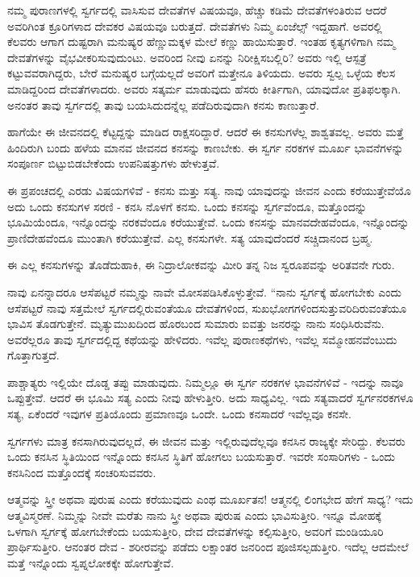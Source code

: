 ನಮ್ಮ ಪುರಾಣಗಳಲ್ಲಿ ಸ್ವರ್ಗದಲ್ಲಿ ವಾಸಿಸುವ ದೇವತೆಗಳ ವಿಷಯವೂ, ಹೆಚ್ಚು ಕಡಿಮೆ ದೇವತೆಗಳಂತಿರುವ ಆದರೆ ಅವರಿಗಿಂತ ಕ್ರೂರಿಗಳಾದ ದೇವಕರ ವಿಷಯವೂ ಬರುತ್ತದೆ. ದೇವತೆಗಳು ನಿಮ್ಮ ಏಂಜೆಲ್ಸ್  ಇದ್ದಹಾಗೆ. ಅವರಲ್ಲಿ ಕೆಲವರು ಆಗಾಗ ದುಷ್ಟರಾಗಿ ಮನುಷ್ಯರ ಹೆಣ್ಣುಮಕ್ಕಳ ಮೇಲೆ ಕಣ್ಣು ಹಾಯಿಸುತ್ತಾರೆ. ಇಂತಹ ಕೃತ್ಯಗಳಿಗಾಗಿ ನಮ್ಮ ದೇವತೆಗಳನ್ನು ವೈಭವೀಕರಿಸುವುದುಂಟು. ಅವರಿಂದ ನೀವು ಏನನ್ನು ನಿರೀಕ್ಷಿಸಬಲ್ಲಿರಿ? ಅವರು ಇಲ್ಲಿ ಆಸ್ಪತ್ರೆ ಕಟ್ಟುವವರಾಗಿದ್ದರು, ಬೇರೆ ಮನುಷ್ಯರ ಬಗ್ಗೆಯಲ್ಲದೆ ಅವರಿಗೆ ಮತ್ತೇನೂ ತಿಳಿಯದು. ಅವರು ಸ್ವಲ್ಪ ಒಳ್ಳೆಯ ಕೆಲಸ ಮಾಡಿದ್ದರಿಂದ ದೇವತೆಗಳಾದರು. ಅವರು ಸತ್ಕರ್ಮ ಮಾಡುವುದು ಹೆಸರು ಕೀರ್ತಿಗಾಗಿ, ಯಾವುದೋ ಪ್ರತಿಫಲಕ್ಕಾಗಿ. ಅನಂತರ ತಾವು ಸ್ವರ್ಗದಲ್ಲಿ ತಾವು ಬಯಸಿದುದನ್ನೆಲ್ಲ ಪಡೆದಿರುವುದಾಗಿ ಕನಸು ಕಾಣುತ್ತಾರೆ.

ಹಾಗೆಯೇ ಈ ಜೀವನದಲ್ಲಿ ಕೆಟ್ಟದ್ದನ್ನು ಮಾಡಿದ ರಾಕ್ಷಸರಿದ್ದಾರೆ. ಆದರೆ ಈ ಕನಸುಗಳೆಲ್ಲ ಶಾಶ್ವತವಲ್ಲ. ಅವರು ಮತ್ತೆ ಹಿಂದಿರುಗಿ ಬಂದು ಹಳೆಯ ಮಾನವ ಜೀವನದ ಕನಸನ್ನು ಕಾಣಬೇಕು. ಈ ಸ್ವರ್ಗ ನರಕಗಳ ಮೂರ್ಖ ಭಾವನೆಗಳನ್ನು ಸಂಪೂರ್ಣ ಬಿಟ್ಟುಬಿಡಬೇಕೆಂದು ಉಪನಿಷತ್ತುಗಳು ಹೇಳುತ್ತವೆ.

ಈ ಪ್ರಪಂಚದಲ್ಲಿ ಎರಡು ವಿಷಯಗಳಿವೆ - ಕನಸು ಮತ್ತು ಸತ್ಯ. ನಾವು ಯಾವುದನ್ನು ಜೀವನ ಎಂದು ಕರೆಯುತ್ತೇವೆಯೊ ಅದು ಒಂದು ಕನಸುಗಳ ಸರಣಿ - ಕನಸಿ ನೊಳಗೆ ಕನಸು. ಒಂದು ಕನಸನ್ನು ಸ್ವರ್ಗವೆಂದೂ, ಮತ್ತೊಂದನ್ನು ಭೂಮಿಯೆಂದೂ, ಇನ್ನೊಂದನ್ನು ನರಕವೆಂದೂ ಕರೆಯುತ್ತೇವೆ. ಒಂದು ಕನಸನ್ನು ಮಾನವದೇಹವೆಂದೂ, ಇನ್ನೊಂದನ್ನು ಪ್ರಾಣಿದೇಹವೆಂದೂ ಮುಂತಾಗಿ ಕರೆಯುತ್ತೇವೆ. ಎಲ್ಲ ಕನಸುಗಳೇ. ಸತ್ಯ ಯಾವುದೆಂದರೆ ಸಚ್ಚಿದಾನಂದ ಬ್ರಹ್ಮ.

ಈ ಎಲ್ಲ ಕನಸುಗಳನ್ನು ತೊಡೆದುಹಾಕಿ, ಈ ನಿದ್ರಾಲೋಕವನ್ನು ಮೀರಿ ತನ್ನ ನಿಜ ಸ್ವರೂಪವನ್ನು ಅರಿತವನೇ ಗುರು.

ನಾವು ಏನನ್ನಾದರೂ ಆಸೆಪಟ್ಟರೆ ನಮ್ಮನ್ನು ನಾವೇ ಮೋಸಪಡಿಸಿಕೊಳ್ಳುತ್ತೇವೆ. “ನಾನು ಸ್ವರ್ಗಕ್ಕೆ ಹೋಗಬೇಕು ಎಂದು ಆಸೆಪಟ್ಟರೆ ನಾವು ಸತ್ತಮೇಲೆ ಸ್ವರ್ಗದಲ್ಲಿರುವಂತೆಯೂ ದೇವತೆಗಳಿಂದ, ಸುಖಭೋಗಗಳಿಂದಸುತ್ತುವರಿದಿರುವಂತೆಯೂ ಭಾವಿಸ ತೊಡಗುತ್ತೇನೆ. ಮೃತ್ಯುಮುಖದಿಂದ ಹೊರಬಂದ ಸುಮಾರು ಐವತ್ತು ಜನರನ್ನು ನಾನು ಸಂಧಿಸಿರುವೆನು. ಅವರೆಲ್ಲರೂ ತಾವು ಸ್ವರ್ಗದಲ್ಲಿದ್ದ ಕಥೆಯನ್ನು ಹೇಳಿದರು. ಇವೆಲ್ಲ ಪುರಾಣಕಥೆಗಳು, ಇವೆಲ್ಲ ಸಮ್ಮೋಹನವೆಂಬುದು ಗೊತ್ತಾಗುತ್ತದೆ.

ಪಾಶ್ಚಾತ್ಯರು ಇಲ್ಲಿಯೇ ದೊಡ್ಡ ತಪ್ಪು ಮಾಡುವುದು. ನಿಮ್ಮಲ್ಲೂ ಈ ಸ್ವರ್ಗ ನರಕಗಳ ಭಾವನೆಗಳಿವೆ - ಇದನ್ನು ನಾವೂ ಒಪ್ಪುತ್ತೇವೆ. ಆದರೆ ಈ ಭೂಮಿ ಸತ್ಯ ಎಂದು ನೀವು ಹೇಳುತ್ತೀರಿ. ಅದು ಸಾಧ್ಯವಿಲ್ಲ. ಇದು ಸತ್ಯವಾದರೆ ಸ್ವರ್ಗನರಕಗಳೂ ಸತ್ಯ, ಏಕೆಂದರೆ ಇವುಗಳ ಪ್ರತಿಯೊಂದು ಪ್ರಮಾಣವೂ ಒಂದೇ. ಒಂದು ಕನಸಾದರೆ ಇವೆಲ್ಲವೂ ಕನಸೇ.

ಸ್ವರ್ಗಗಳು ಮಾತ್ರ ಕನಸಾಗಿರುವುದಲ್ಲದೆ, ಈ ಜೀವನ ಮತ್ತು ಇಲ್ಲಿರುವುದೆಲ್ಲವೂ ಕನಸಿನ ರಾಜ್ಯಕ್ಕೇ ಸೇರಿದ್ದು. ಕೆಲವರು ಒಂದು ಕನಸಿನ ಸ್ಥಿತಿಯಿಂದ ಇನ್ನೊಂದು ಕನಸಿನ ಸ್ಥಿತಿಗೆ ಹೋಗಲು ಬಯಸುತ್ತಾರೆ. ಇವರೇ ಸಂಸಾರಿಗಳು - ಒಂದು ಕನಸಿನಿಂದ ಮತ್ತೊಂದಕ್ಕೆ ಸಂಚರಿಸುವವರು.

ಆತ್ಮವನ್ನು ಸ್ತ್ರೀ ಅಥವಾ ಪುರುಷ ಎಂದು ಕರೆಯುವುದು ಎಂಥ ಮೂರ್ಖತನ! ಆತ್ಮನಲ್ಲಿ ಲಿಂಗಭೇದ ಹೇಗೆ ಸಾಧ್ಯ? ಇದು ಆತ್ಮವಿಸ್ಮರಣೆ. ನಿಮ್ಮನ್ನು ನೀವೇ ಮರೆತು ನಾನು ಸ್ತ್ರೀ ಅಥವಾ ಪುರುಷ ಎಂದು ಭಾವಿಸುತ್ತೀರಿ. ಇನ್ನೂ ಮೋಹಕ್ಕೆ ಒಳಗಾಗಿ ಸ್ವರ್ಗಕ್ಕೆ ಹೋಗಬೇಕೆಂದು ಬಯಸುತ್ತೀರಿ, ದೇವ ದೇವತೆಗಳನ್ನು ಕಲ್ಪಿಸುತ್ತೀರಿ, ಅವರಿಗೆ ಮಂಡಿಯೂರಿ ಪ್ರಾರ್ಥಿಸುತ್ತೀರಿ. ಆನಂತರ ದೇವ - ಶರೀರವನ್ನು ಪಡೆದು ಲಕ್ಷಾಂತರ ಜನರಿಂದ ಪೂಜಿಸಲ್ಪಡುತ್ತೀರಿ. ಇದೆಲ್ಲ ಆದಮೇಲೆ ಮತ್ತೆ ಇನ್ನೊಂದು ಸ್ವಪ್ನಲೋಕಕ್ಕೇ ಹೋಗುತ್ತೇವೆ.

